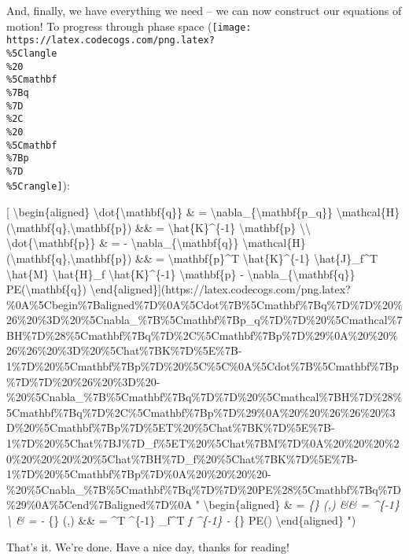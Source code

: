 \documentclass[]{article}
\begin{document}
And, finally, we have everything we need -- we can now construct our equations
of motion! To progress through phase space
(\texttt{[image: https://latex.codecogs.com/png.latex?\\\%5Clangle\\\%20\\\%5Cmathbf\\\%7Bq\\\%7D\\\%2C\\\%20\\\%5Cmathbf\\\%7Bp\\\%7D\\\%5Crangle]}):

{[} \textbackslash{}begin\{aligned\}
\textbackslash{}dot\{\textbackslash{}mathbf\{q\}\} \& =
\textbackslash{}nabla\_\{\textbackslash{}mathbf\{p\_q\}\}
\textbackslash{}mathcal\{H\}(\textbackslash{}mathbf\{q\},\textbackslash{}mathbf\{p\})
\&\& = \textbackslash{}hat\{K\}\^{}\{-1\} \textbackslash{}mathbf\{p\}
\textbackslash{}\textbackslash{}
\textbackslash{}dot\{\textbackslash{}mathbf\{p\}\} \& = -
\textbackslash{}nabla\_\{\textbackslash{}mathbf\{q\}\}
\textbackslash{}mathcal\{H\}(\textbackslash{}mathbf\{q\},\textbackslash{}mathbf\{p\})
\&\& = \textbackslash{}mathbf\{p\}\^{}T \textbackslash{}hat\{K\}\^{}\{-1\}
\textbackslash{}hat\{J\}\_f\^{}T \textbackslash{}hat\{M\}
\textbackslash{}hat\{H\}\_f \textbackslash{}hat\{K\}\^{}\{-1\}
\textbackslash{}mathbf\{p\} -
\textbackslash{}nabla\_\{\textbackslash{}mathbf\{q\}\}
PE(\textbackslash{}mathbf\{q\})
\textbackslash{}end\{aligned\}{]}(https://latex.codecogs.com/png.latex?\%0A\%5Cbegin\%7Baligned\%7D\%0A\%5Cdot\%7B\%5Cmathbf\%7Bq\%7D\%7D\%20\%26\%20\%3D\%20\%5Cnabla\_\%7B\%5Cmathbf\%7Bp\_q\%7D\%7D\%20\%5Cmathcal\%7BH\%7D\%28\%5Cmathbf\%7Bq\%7D\%2C\%5Cmathbf\%7Bp\%7D\%29\%0A\%20\%20\%26\%26\%20\%3D\%20\%5Chat\%7BK\%7D\%5E\%7B-1\%7D\%20\%5Cmathbf\%7Bp\%7D\%20\%5C\%5C\%0A\%5Cdot\%7B\%5Cmathbf\%7Bp\%7D\%7D\%20\%26\%20\%3D\%20-\%20\%5Cnabla\_\%7B\%5Cmathbf\%7Bq\%7D\%7D\%20\%5Cmathcal\%7BH\%7D\%28\%5Cmathbf\%7Bq\%7D\%2C\%5Cmathbf\%7Bp\%7D\%29\%0A\%20\%20\%26\%26\%20\%3D\%20\%5Cmathbf\%7Bp\%7D\%5ET\%20\%5Chat\%7BK\%7D\%5E\%7B-1\%7D\%20\%5Chat\%7BJ\%7D\_f\%5ET\%20\%5Chat\%7BM\%7D\%0A\%20\%20\%20\%20\%20\%20\%20\%20\%5Chat\%7BH\%7D\_f\%20\%5Chat\%7BK\%7D\%5E\%7B-1\%7D\%20\%5Cmathbf\%7Bp\%7D\%0A\%20\%20\%20\%20-\%20\%5Cnabla\_\%7B\%5Cmathbf\%7Bq\%7D\%7D\%20PE\%28\%5Cmathbf\%7Bq\%7D\%29\%0A\%5Cend\%7Baligned\%7D\%0A
" \textbackslash{}begin\{aligned\}  \& =
\nabla\emph{\{\} (,) \&\& =
\^{}\{-1\}  \textbackslash{}  \& = -
\nabla}\{\} (,) \&\& = \^{}T
\^{}\{-1\} \_f\^{}T  \emph{f \^{}\{-1\}
 - \nabla}\{\} PE() \textbackslash{}end\{aligned\}
")

That's it. We're done. Have a nice day, thanks for reading!
\end{document}
